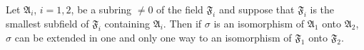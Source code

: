 Let $\mathfrak{A}_i$, $i = 1, 2$, be a subring $\neq 0$ of the field $\mathfrak{F}_i$ and suppose that $\mathfrak{F}_i$ is the smallest subfield of $\mathfrak{F}_i$ containing $\mathfrak{A}_i$. Then if $\sigma$ is an isomorphism of $\mathfrak{A}_1$ onto $\mathfrak{A}_2$, $\sigma$ can be extended in one and only one way to an isomorphism of $\mathfrak{F}_1$ onto $\mathfrak{F}_2$.
